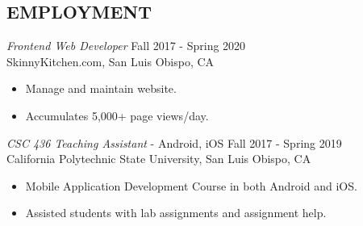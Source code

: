 \documentclass[margin]{res}
\begin{document}
\begin{resume}
                

\section{EMPLOYMENT} {\sl Frontend Web Developer} \hfill Fall 2017 - Spring 2020 \\
                SkinnyKitchen.com, San Luis Obispo, CA
                 \begin{itemize}  \itemsep -2pt %
                 \item Manage and maintain website.
                \item Accumulates 5,000+ page views/day.
                \end{itemize}

                {\sl CSC 436 Teaching Assistant} - Android, iOS \hfill Fall 2017 - Spring 2019 \\
                California Polytechnic State University, San Luis Obispo, CA
                 \begin{itemize}  \itemsep -2pt %
                 \item Mobile Application Development Course in both Android and iOS.
                 \item Assisted students with lab assignments and assignment help.
                \end{itemize}



\end{resume}
\end{document}
